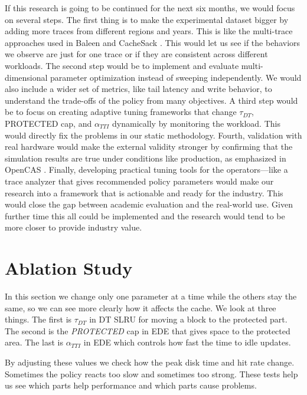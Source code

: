 \documentclass[sigconf]{acmart}
\begin{document}
If this research is going to be continued for the next six months, we would focus on several steps. The first thing is to make the experimental dataset bigger by adding more traces from different regions and years. This is like the multi-trace approaches used in Baleen \cite{wong2024baleen} and CacheSack \cite{Yang2022CacheSack}. This would let us see if the behaviors we observe are just for one trace or if they are consistent across different workloads. The second step would be to implement and evaluate multi-dimensional parameter optimization instead of sweeping independently. We would also include a wider set of metrics, like tail latency and write behavior, to understand the trade-offs of the policy from many objectives. A third step would be to focus on creating adaptive tuning frameworks that change $\tau_{DT}$, PROTECTED cap, and $\alpha_{TTI}$ dynamically by monitoring the workload. This would directly fix the problems in our static methodology. Fourth, validation with real hardware would make the external validity stronger by confirming that the simulation results are true under conditions like production, as emphasized in OpenCAS \cite{Duan2025CrashConsistency}. Finally, developing practical tuning tools for the operators—like a trace analyzer that gives recommended policy parameters would make our research into a framework that is actionable and ready for the industry. This would close the gap between academic evaluation and the real-world use. Given further time this all could be implemented and the research would tend to be more closer to provide industry value.


\clearpage
\section{Ablation Study}
\label{sec:ablation Study}
\FloatBarrier

In this section we change only one parameter at a time while the others stay the same, so we can see more clearly how it affects the cache. We look at three things. The first is $\tau_{DT}$ in DT SLRU for moving a block to the protected part. The second is the \textit{PROTECTED} cap in EDE that gives space to the protected area. The last is $\alpha_{TTI}$ in EDE which controls how fast the time to idle updates.

By adjusting these values we check how the peak disk time and hit rate change. Sometimes the policy reacts too slow and sometimes too strong. These tests help us see which parts help performance and which parts cause problems.
\end{document}
